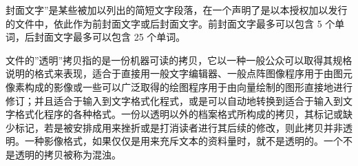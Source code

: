 
封面文字''是某些被加以列出的简短文字段落，在一个声明了是以本授权加以发行的文件中，依此作为前封面文字或后封面文字。前封面文字最多可以包含 5 个单词，后封面文字最多可以包含 25 个单词。


文件的''透明''拷贝指的是一份机器可读的拷贝，它以一种一般公众可以取得其规格说明的格式来表现，适合于直接用一般文字编辑器、一般点阵图像程序用于由图元像素构成的影像或一些可以广泛取得的绘图程序用于由向量绘制的图形直接地进行修订；并且适合于输入到文字格式化程式，或是可以自动地转换到适合于输入到文字格式化程序的各种格式。一份以透明以外的档案格式所构成的拷贝，其标记或缺少标记，若是被安排成用来挫折或是打消读者进行其后续的修改，则此拷贝并非透明。一种影像格式，如果仅仅是用来充斥文本的资料量时，就不是透明的。一个不是透明的拷贝被称为混浊。


